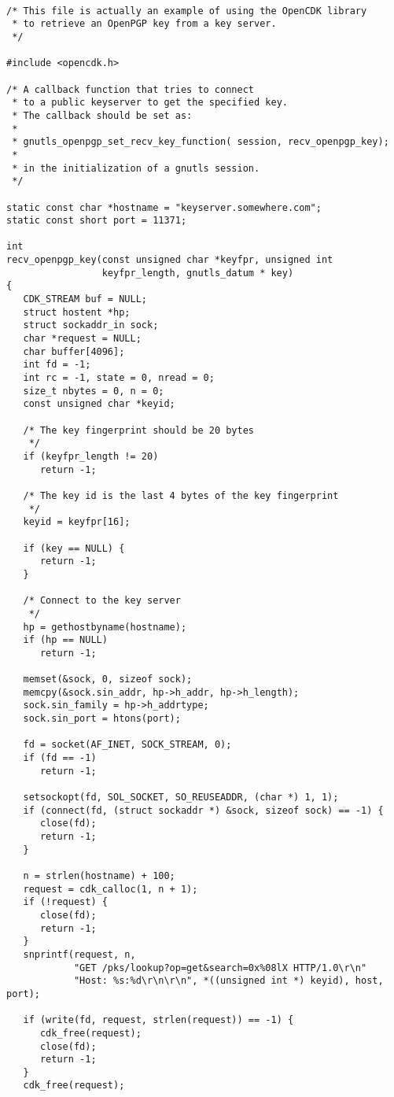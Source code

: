 \begin {verbatim}

/* This file is actually an example of using the OpenCDK library
 * to retrieve an OpenPGP key from a key server.
 */

#include <opencdk.h>

/* A callback function that tries to connect
 * to a public keyserver to get the specified key.
 * The callback should be set as:
 *
 * gnutls_openpgp_set_recv_key_function( session, recv_openpgp_key);
 *
 * in the initialization of a gnutls session.
 */

static const char *hostname = "keyserver.somewhere.com";
static const short port = 11371;

int
recv_openpgp_key(const unsigned char *keyfpr, unsigned int
                 keyfpr_length, gnutls_datum * key)
{
   CDK_STREAM buf = NULL;
   struct hostent *hp;
   struct sockaddr_in sock;
   char *request = NULL;
   char buffer[4096];
   int fd = -1;
   int rc = -1, state = 0, nread = 0;
   size_t nbytes = 0, n = 0;
   const unsigned char *keyid;

   /* The key fingerprint should be 20 bytes
    */
   if (keyfpr_length != 20)
      return -1;

   /* The key id is the last 4 bytes of the key fingerprint
    */
   keyid = keyfpr[16];

   if (key == NULL) {
      return -1;
   }

   /* Connect to the key server 
    */
   hp = gethostbyname(hostname);
   if (hp == NULL)
      return -1;

   memset(&sock, 0, sizeof sock);
   memcpy(&sock.sin_addr, hp->h_addr, hp->h_length);
   sock.sin_family = hp->h_addrtype;
   sock.sin_port = htons(port);

   fd = socket(AF_INET, SOCK_STREAM, 0);
   if (fd == -1)
      return -1;

   setsockopt(fd, SOL_SOCKET, SO_REUSEADDR, (char *) 1, 1);
   if (connect(fd, (struct sockaddr *) &sock, sizeof sock) == -1) {
      close(fd);
      return -1;
   }

   n = strlen(hostname) + 100;
   request = cdk_calloc(1, n + 1);
   if (!request) {
      close(fd);
      return -1;
   }
   snprintf(request, n,
            "GET /pks/lookup?op=get&search=0x%
            "Host: %

   if (write(fd, request, strlen(request)) == -1) {
      cdk_free(request);
      close(fd);
      return -1;
   }
   cdk_free(request);


\end{verbatim}
